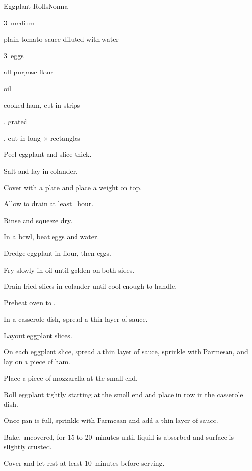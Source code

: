 \begin{recipe}{Eggplant Rolls}{Nonna}{}

\begin{ingredients}
\item 3~medium 
\item plain tomato sauce diluted with water
\item 3~eggs
\item all-purpose flour
\item oil
\item cooked ham, cut in  strips
\item {}, grated 
\item {}, cut in long \inch{\quarter}$\times$\inch{\quarter} rectangles
\end{ingredients}

\begin{directions}
\item Peel eggplant and slice \inch{\quarter} thick.
\item Salt and lay in colander.
\item Cover with a plate and place a weight on top.
\item Allow to drain at least \half{}~hour.
\item Rinse and squeeze dry.
\item In a bowl, beat eggs and \C{\half} water.
\item Dredge eggplant in flour, then eggs.
\item Fry slowly in  oil until golden on both sides.
\item Drain fried slices in colander until cool enough to handle.
\item Preheat oven to .
\item In a casserole dish, spread a thin layer of sauce.
\item Layout eggplant slices.
\item On each eggplant slice, spread a thin layer of sauce, sprinkle with Parmesan, and lay on a piece of ham.
\item Place a piece of mozzarella at the small end.
\item Roll eggplant tightly starting at the small end and place in row in the casserole dish.
\item Once pan is full, sprinkle with Parmesan and add a thin layer of sauce.
\item Bake, uncovered, for 15 to 20~minutes until liquid is absorbed and surface is slightly crusted.
\item Cover and let rest at least 10~minutes before serving.
\end{directions}

\end{recipe}
